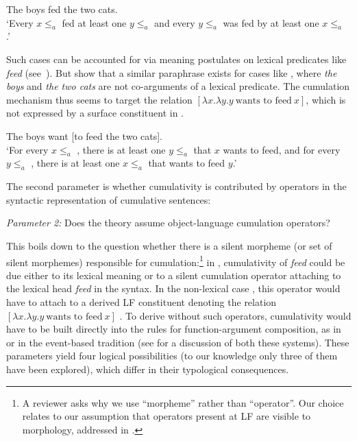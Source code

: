 \documentclass[output=paper]{langscibook}
\begin{document}
 \ea\label{has-sch:4a} The boys fed the two cats. \\
`Every $x \leq_a$  fed at least one $y \leq_a$  and every $y \leq_a$  was fed by at least one $x \leq_a$ .'
\z
 
\noindent Such cases can be accounted for via meaning postulates on lexical predicates like \textit{feed} (see~\citealt{Scha:1981, Krifka:1986}). But \citet{Beck:2000a} show that a similar paraphrase exists for cases like , where \textit{the boys} and \textit{the two cats} are not co-arguments of a lexical predicate. The cumulation mechanism thus seems to target the relation $[\lambda x.\lambda y.y\ \text{wants to feed}\ x]$, which is not expressed by a surface constituent in .

\ea\label{has-sch:4b} The boys want [to feed the two cats]. \\
`For every $x \leq_a$ , there is at least one $y \leq_a$  that $x$ wants to feed, and for every $y \leq_a$ , there is at least one $x \leq_a$  that wants to feed $y$.'
\z

\noindent The second parameter is whether cumulativity is contributed by operators in the syntactic representation of cumulative sentences:

\ea\label{has-sch:par2} \textit{Parameter 2:} Does the theory assume object-language cumulation operators? \z

\noindent This boils down to the question whether there is a silent morpheme (or set of silent morphemes) responsible for cumulation:\footnote{A reviewer asks why we use ``morpheme'' rather than ``operator''. Our choice relates to our assumption that operators present at LF are visible to morphology, addressed in .} in , cumulativity of \textit{feed} could be due either to its lexical meaning or to a silent cumulation operator attaching to the lexical head \textit{feed} in the syntax. In the non-lexical case , this operator would have to attach to a derived LF constituent denoting the relation $[\lambda x.\lambda y.y\ \text{wants to feed}\ x]$ \citep{Beck:2000a}. To derive  without such operators, cumulativity would have to be built directly into the rules for function-argument composition, as in \citet{Schmitt:2019} or in the event-based tradition (see  for a discussion of both these systems). These parameters yield four logical possibilities (to our knowledge only three of them have been explored), which differ in their typological consequences.
\end{document}
